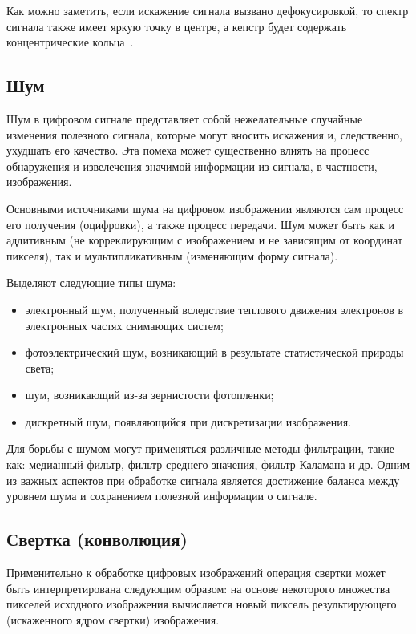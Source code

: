 Как можно заметить, если искажение сигнала вызвано дефокусировкой, то спектр сигнала также имеет яркую точку в центре, а кепстр будет содержать концентрические кольца~\cite{rings}.

\subsection{Шум}

Шум в цифровом сигнале представляет собой нежелательные случайные изменения полезного сигнала, которые могут вносить искажения и, следственно, ухудшать его качество. Эта помеха может существенно влиять на процесс обнаружения и извелечения значимой информации из сигнала, в частности, изображения.

Основными источниками шума на цифровом изображении являются сам процесс его получения (оцифровки), а также процесс передачи. Шум может быть как и аддитивным (не корреклирующим с изображением и не зависящим от координат пикселя), так и мультипликативным (изменяющим форму сигнала).

Выделяют следующие типы шума:

\begin{itemize}
	\item электронный шум, полученный вследствие теплового движения электронов в электронных частях снимающих систем;
	\item фотоэлектрический шум, возникающий в результате статистической природы света;
	\item шум, возникающий из-за зернистости фотопленки;
	\item дискретный шум, появляющийся при дискретизации изображения.
\end{itemize}

Для борьбы с шумом могут применяться различные методы фильтрации, такие как: медианный фильтр, фильтр среднего значения, фильтр Каламана и др. Одним из важных аспектов при обработке сигнала является достижение баланса между уровнем шума и сохранением полезной информации о сигнале.

\subsection{Свертка (конволюция)}

Применительно к обработке цифровых изображений операция свертки может быть интерпретирована следующим образом: на основе некоторого множества пикселей исходного изображения вычисляется новый пиксель результирующего (искаженного ядром свертки) изображения.

